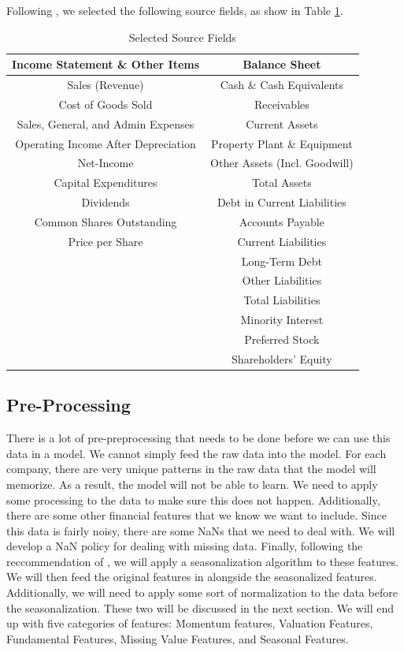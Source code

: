 \documentclass[AER]{AEA}
\begin{document}
Following \cite{euclidean}, we selected the following source fields, as show in Table \ref{tab:source_fields}.

\begin{table}[ht]
    \centering
    \begin{tabular}{|c|c|}
        \hline
        \textbf{Income Statement \& Other Items} & \textbf{Balance Sheet} \\
        \hline
        Sales (Revenue) & Cash \& Cash Equivalents \\
        Cost of Goods Sold & Receivables \\
        Sales, General, and Admin Expenses & Current Assets \\
        Operating Income After Depreciation & Property Plant \& Equipment \\
        Net-Income & Other Assets (Incl. Goodwill) \\
        Capital Expenditures & Total Assets \\
        Dividends & Debt in Current Liabilities \\
        Common Shares Outstanding & Accounts Payable \\
        Price per Share & Current Liabilities \\
        & Long-Term Debt \\
        & Other Liabilities \\
        & Total Liabilities \\
        & Minority Interest \\
        & Preferred Stock \\
        & Shareholders’ Equity \\
        \hline
    \end{tabular}
    \caption{Selected Source Fields}
    \label{tab:source_fields}
\end{table}
\subsection{Pre-Processing}
There is a lot of pre-preprocessing that needs to be done before we can use this data in a model. 
We cannot simply feed the raw data into the model. 
For each company, there are very unique patterns in the raw data that the model will memorize.
As a result, the model will not be able to learn. We need to apply some processing to the data to make sure
this does not happen. Additionally, there are some other financial features that we know we want to include.
Since this data is fairly noisy, there are some NaNs that we need to deal with. 
We will develop a NaN policy for dealing with missing data.
Finally, following the reccommendation of \cite{seasonalization}, we will apply a seasonalization algorithm to these features.
We will then feed the original features in alongside the seasonalized features.
Additionally, we will need to apply some sort of normalization to the data before the seasonalization. 
These two will be discussed in the next section.
We will end up with five categories of features: 
Momentum features, Valuation Features, Fundamental Features, Missing Value Features, and Seasonal Features.
\end{document}
